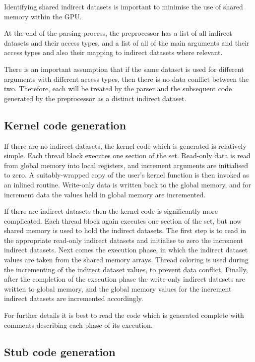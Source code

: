 \documentclass[12pt]{article}
\begin{document}
Identifying shared indirect datasets is important to minimise
the use of shared memory within the GPU.

At the end of the parsing process, the preprocessor has a 
list of all indirect datasets and their access types, and a 
list of all of the main arguments and their access types and 
also their mapping to indirect datasets where relevant.

There is an important assumption that if the same dataset is
used for different arguments with different access types, then
there is no data conflict between the two.  Therefore, each will
be treated by the parser and the subsequent code generated by 
the preprocessor as a distinct indirect dataset.

\subsection{Kernel code generation}

If there are no indirect datasets, the kernel code which is 
generated is relatively simple.  Each thread block executes
one section of the set.  Read-only data is read from global 
memory into local registers, and increment arguments are 
initialised to zero.  A suitably-wrapped copy of the user's 
kernel function is then invoked as an inlined routine.  
Write-only data is written back to the global memory, and
for increment data the values held in global memory are 
incremented.


If there are indirect datasets then the kernel code is 
significantly more complicated.  Each thread block again
executes one section of the set, but now shared memory
is used to hold the indirect datasets.  The first step 
is to read in the appropriate read-only indirect datasets 
and initialise to zero the increment indirect datasets.
Next comes the execution phase, in which the indirect 
dataset values are taken from the shared memory arrays.
Thread coloring is used during the incrementing of the 
indirect dataset values, to prevent data conflict.
Finally, after the completion of the execution phase
the write-only indirect datasets are written to global 
memory, and the global memory values for the increment 
indirect datasets are incremented accordingly.

For further details it is best to read the code which 
is generated complete with comments describing each 
phase of its execution.

\subsection{Stub code generation}
\end{document}
